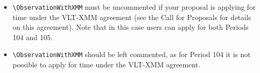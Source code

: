\documentclass{article}
\begin{document}
\ifodd\period
 \begin{itemize}
  \item \verb|\ObservationWithXMM| must be uncommented if your proposal
   is applying for time under the VLT-XMM agreement (see the Call for
   Proposals for details on this agreement).  Note that in this case
   users can apply for both Periods 104 and 105.
 \end{itemize}
\else
 \begin{itemize}
 \item \verb|\ObservationWithXMM| should be left commented, as for
   Period 104 it is not possible to apply for time under the
   VLT-XMM agreement.
 \end{itemize}
\fi

\end{document}
